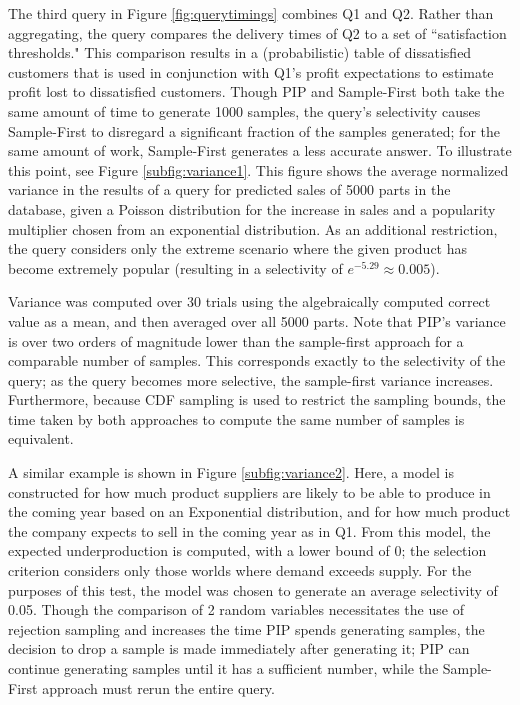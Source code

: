 The third query in Figure \ref{fig:querytimings} combines Q1 and Q2.  Rather than aggregating, the query compares the delivery times of Q2 to a set of ``satisfaction thresholds."  This comparison results in a (probabilistic) table of dissatisfied customers that is used in conjunction with Q1's profit expectations to estimate profit lost to dissatisfied customers.  
Though PIP and Sample-First both take the same amount of time to generate 1000 samples, the query's selectivity causes Sample-First to disregard a significant fraction of the samples generated; for the same amount of work, Sample-First generates a less accurate answer.  To illustrate this point, see Figure \ref{subfig:variance1}.  This figure shows the average normalized variance in the results of a query for predicted sales of 5000 parts in the database, given a Poisson distribution for the increase in sales and a popularity multiplier chosen from an exponential distribution.  As an additional restriction, the query considers only the extreme scenario where the given product has become extremely popular (resulting in a selectivity of $e^{-5.29} \approx 0.005$).  

Variance was computed over 30 trials using the algebraically computed correct value as a mean, and then averaged over all 5000 parts.  Note that PIP's variance is over two orders of magnitude lower than the sample-first approach for a comparable number of samples.  This corresponds exactly to the selectivity of the query; as the query becomes more selective, the sample-first variance increases.  Furthermore, because CDF sampling is used to restrict the sampling bounds, the time taken by both approaches to compute the same number of samples is equivalent.

A similar example is shown in Figure \ref{subfig:variance2}.  Here, a model is constructed for how much product suppliers are likely to be able to produce in the coming year based on an Exponential distribution, and for how much product the company expects to sell in the coming year as in Q1.  From this model, the expected underproduction is computed, with a lower bound of 0; the selection criterion considers only those worlds where demand exceeds supply.  For the purposes of this test, the model was chosen to generate an average selectivity of 0.05.  Though the comparison of 2 random variables necessitates the use of rejection sampling and increases the time PIP spends generating samples, the decision to drop a sample is made immediately after generating it; PIP can continue generating samples until it has a sufficient number, while the Sample-First approach must rerun the entire query.

